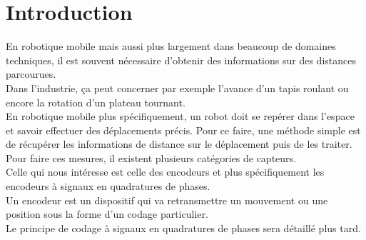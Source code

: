 \section{Introduction}
En robotique mobile mais aussi plus largement dans beaucoup de domaines techniques, il est souvent nécessaire d'obtenir des informations sur des distances parcourues.
\\Dans l'industrie, ça peut concerner par exemple l'avance d'un tapis roulant ou encore la rotation d'un plateau tournant.
\\En robotique mobile plus  spécifiquement, un robot doit se repérer dans l'espace et savoir effectuer des déplacements précis. Pour ce faire, une méthode simple est de récupérer les informations de distance sur le déplacement puis de les traiter.\\

Pour faire ces mesures, il existent plusieurs catégories de capteurs.\\
Celle qui nous intéresse est celle des encodeurs et plus spécifiquement les encodeurs à signaux en quadratures de phases.\\
Un encodeur est un dispositif qui va retransmettre un mouvement ou une position sous la forme d'un codage particulier.\\

Le principe de codage à signaux en quadratures de phases sera détaillé plus tard.\\








